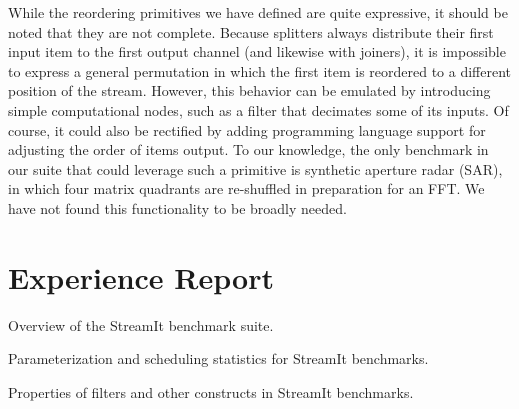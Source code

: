 While the reordering primitives we have defined are quite expressive,
it should be noted that they are not complete.  Because splitters
always distribute their first input item to the first output channel
(and likewise with joiners), it is impossible to express a general
permutation in which the first item is reordered to a different
position of the stream.  However, this behavior can be emulated by
introducing simple computational nodes, such as a filter that
decimates some of its inputs.  Of course, it could also be rectified
by adding programming language support for adjusting the order of
items output.  To our knowledge, the only benchmark in our suite that
could leverage such a primitive is synthetic aperture radar (SAR), in
which four matrix quadrants are re-shuffled in preparation for an FFT.
We have not found this functionality to be broadly needed.


\section{Experience Report}
\label{sec:lang-experience}

\begin{table}[t!]
\vspace{-2\baselineskip}
\vspace{-1.5\baselineskip}
\caption{Overview of the StreamIt benchmark suite.\protect\label{tab:lang-benchmarks}}
\vspace{-0.5in}
\end{table}

\begin{table}[t!]
\vspace{-2\baselineskip}
\vspace{-1.5\baselineskip}
\caption{Parameterization and scheduling statistics for StreamIt 
benchmarks.\protect\label{tab:lang-benchmarks-params}}
\vspace{-0.5in}
\end{table}

\begin{table}[t!]
\vspace{-2.5\baselineskip}
\vspace{-1.5\baselineskip}
\caption{Properties of filters and other constructs in StreamIt 
benchmarks.\protect\label{tab:lang-benchmarks-filters}}
\vspace{-0.5in}
\end{table}

